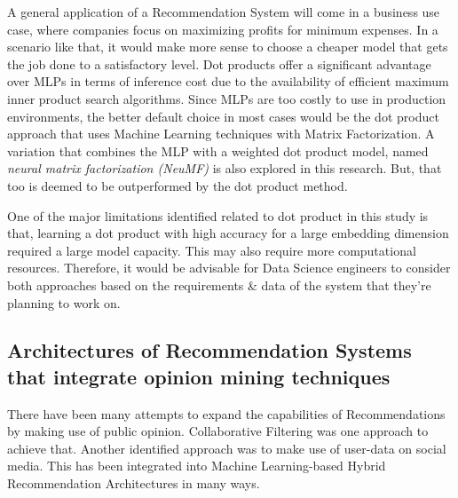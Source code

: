 A general application of a Recommendation System will come in a business use case, where companies focus on maximizing profits for minimum expenses. In a scenario like that, it would make more sense to choose a cheaper model that gets the job done to a satisfactory level. Dot products offer a significant advantage over MLPs in terms of inference cost due to the availability of efficient maximum inner product search algorithms. Since MLPs are too costly to use in production environments, the better default choice in most cases would be the dot product approach that uses Machine Learning techniques with Matrix Factorization.
A variation that combines the MLP with a weighted dot product model, named \emph{neural matrix factorization (NeuMF)} is also explored in this research. But, that too is deemed to be outperformed by the dot product method.

One of the major limitations identified related to dot product in this study is that, learning a dot product with high accuracy for a large embedding dimension required a large model capacity. This may also require more computational resources. Therefore, it would be advisable for Data Science engineers to consider both approaches based on the requirements \& data of the system that they're planning to work on.


\subsection{Architectures of Recommendation Systems that integrate opinion mining techniques}
There have been many attempts to expand the capabilities of Recommendations by making use of public opinion. Collaborative Filtering was one approach to achieve that. Another identified approach was to make use of user-data on social media. This has been integrated into Machine Learning-based Hybrid Recommendation Architectures in many ways. 

